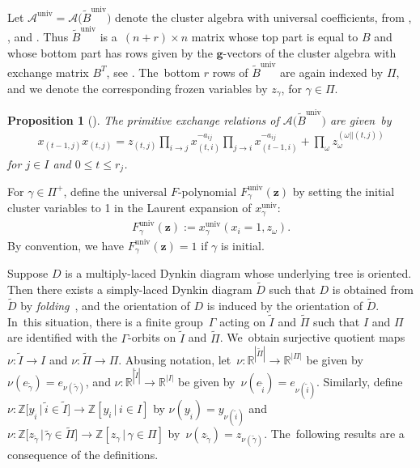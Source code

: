 \documentclass[10pt,a4paper]{amsart}
\def\R{{\mathbb R}}
\def\Z{{\mathbb Z}}
\def\A{{\mathcal{A}}}
\def\univ{{\operatorname{univ}}}
\def\tB{{\tilde B}}
\def\tD{{\tilde D}}
\def\tB{{\tilde B}}
\def\tI{{\tilde I}}
\def\z{{\mathbf z}}
\def\g{{\mathbf g}}
\def\tgamma{{\tilde \gamma}}
\def\tPi{{\tilde \Pi}}
\numberwithin{equation}{section}
\newtheorem{Proposition}[Theorem]{Proposition}
\begin{document}
\bigskip{}
Let $\A^{\univ} = \A\big(\tB^\univ\big)$ denote the cluster algebra with universal coefficients, from \cite[Theorem~12.4]{CA4}, \cite[Section~5]{YZ}, and \cite[Theorem~10.12 and Remark 10.13]{Reading}. Thus $\tB^{\univ}$ is a~$(n+r) \times n$ matrix whose top part is equal to $B$ and whose bottom part has rows given by the $\g$-vectors of the cluster algebra with exchange matrix $B^T$, see \cite{Reading}. The~bottom $r$ rows of $\tB^\univ$ are again indexed by $\Pi$, and we denote the corresponding frozen variables by $z_\gamma$, for $\gamma \in \Pi$.

\begin{Proposition}[{\cite[Proposition~5.6]{YZ}}] \label{prop:YZ}
The primitive exchange relations of $\A\big(\tB^\univ\big)$ are given~by
\begin{gather}\label{eq:exchange}
x_{(t-1,j)} x_{(t,j)} = z_{(t,j)} \prod_{i \to j} x_{(t,i)}^{-a_{ij}} \prod_{j \to i} x_{(t-1,i)}^{-a_{ij}} + \prod_\omega z_\omega^{(\omega|| (t,j))}
\end{gather}
for $j \in I$ and $0 \leq t \leq r_j$.
\end{Proposition}

\bigskip{}
For $\gamma \in \Pi^+$, define the universal $F$-polynomial $F^\univ_\gamma(\z)$ by setting the initial cluster variables to 1 in the Laurent expansion of $x^\univ_\gamma$:
\begin{gather*}
F^\univ_\gamma(\z) := x^\univ_\gamma(x_i = 1, z_\omega).
\end{gather*}
By convention, we have $F^\univ_\gamma(\z) = 1$ if $\gamma$ is initial.

\bigskip{} %
Suppose $D$ is a multiply-laced Dynkin diagram whose underlying tree is oriented. Then there exists a simply-laced Dynkin diagram $\tD$ such that $D$ is obtained from $\tD$ by \emph{folding}~\cite{Dup}, and the orientation of $D$ is induced by the orientation of $\tD$. In~this situation, there is a finite group~$\Gamma$ acting on $\tilde I$ and $\tPi$ such that $I$ and $\Pi$ are identified with the $\Gamma$-orbits on $\tilde I$ and $\tPi$. We~obtain surjective quotient maps $\nu\colon \tI \to I$ and $\nu\colon \tPi \to \Pi$.
Abusing notation, let~$\nu\colon \R^{|\tPi|} \to \R^{|\Pi|}$ be given by $\nu(e_{\tgamma}) = e_{\nu(\tgamma)}$, and $\nu\colon \R^{|\tilde I|} \to \R^{|I|}$ be given by~$\nu(e_{\tilde i}) = e_{\nu(\tilde i)}$. Similarly, define $\nu\colon \Z\big[y_{\tilde i} \,|\, \tilde i \in \tilde I\big] \to \Z[y_i \,|\, i \in I]$ by $\nu(y_{\tilde i}) = y_{\nu(\tilde i)}$ and $\nu\colon \Z\big[z_{\tgamma} \,|\, \tgamma \in \tPi\big] \to \Z[z_\gamma \,|\, \gamma \in \Pi]$ by~$\nu(z_{\tgamma})= z_{\nu(\tgamma)}$. The~following results are a consequence of the definitions.
\end{document}

